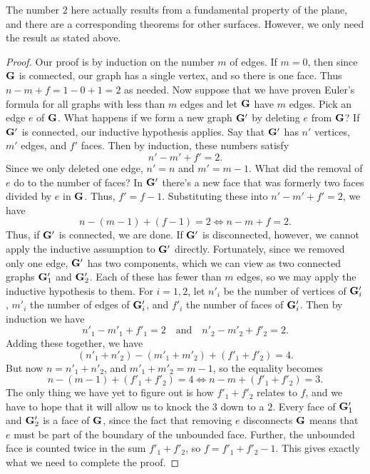 The number $2$ here actually results from a fundamental property of
the plane, and there are a corresponding theorems for other
surfaces. However, we only need the result as stated above.

\begin{proof}
  Our proof is by induction on the number $m$ of edges. If $m=0$, then
  since $\mathbf{G}$ is connected, our graph has a single vertex, and so
  there is one face. Thus $n-m+f = 1-0+1=2$ as needed. Now suppose
  that we have proven Euler's formula for all graphs with less than
  $m$ edges and let $\mathbf{G}$ have $m$ edges. Pick an edge $e$ of
  $\mathbf{G}$. What happens if we form a new graph $\mathbf{G}'$ by deleting $e$
  from $\mathbf{G}$? If $\mathbf{G}'$ is connected, our inductive hypothesis
  applies. Say that $\mathbf{G}'$ has $n'$ vertices, $m'$ edges, and $f'$
  faces. Then by induction, these numbers satisfy
  \[n'-m'+f'=2.\]
  Since we only deleted one edge, $n'=n$ and $m'=m-1$. What did the
  removal of $e$ do to the number of faces? In $\mathbf{G}'$ there's a new
  face that was formerly two faces divided by $e$ in $\mathbf{G}$. Thus,
  $f'=f-1$. Substituting these into $n'-m'+f'=2$, we have
  \[n-(m-1)+(f-1)=2 \iff n-m+f=2.\]
  Thus, if $\mathbf{G}'$ is connected, we are done. If $\mathbf{G}'$ is
  disconnected, however, we cannot apply the inductive assumption to
  $\mathbf{G}'$ directly. Fortunately, since we removed only one edge,
  $\mathbf{G}'$ has two components, which we can view as two connected
  graphs $\mathbf{G}'_1$ and $\mathbf{G}'_2$. Each of these has fewer than $m$
  edges, so we may apply the inductive hypothesis to them. For
  $i=1,2$, let $n'_i$ be the number of vertices of $\mathbf{G}'_i$, $m'_i$
  the number of edges of $\mathbf{G}'_i$, and $f'_i$ the number of faces of
  $\mathbf{G}'_i$. Then by induction we have
  \[n'_1 - m'_1 + f'_1 = 2 \quad \text{and}\quad n'_2-m'_2+f'_2 =2.\]
  Adding these together, we have
  \[(n'_1 + n'_2) - (m'_1 + m'_2) + (f'_1 + f'_2) = 4.\]
  But now $n=n'_1 + n'_2$, and $m'_1 + m'_2 = m-1$, so the equality
  becomes
  \[n - (m-1) + (f'_1+f'_2) = 4 \iff n-m + (f'_1 + f'_2) = 3.\]
  The only thing we have yet to figure out is how $f'_1+f'_2$ relates
  to $f$, and we have to hope that it will allow us to knock the $3$
  down to a $2$. Every face of $\mathbf{G}'_1$ and $\mathbf{G}'_2$ is a face of
  $\mathbf{G}$, since the fact that removing $e$ disconnects $\mathbf{G}$ means
  that $e$ must be part of the boundary of the unbounded
  face. Further, the unbounded face is counted twice in the sum $f'_1
  + f'_2$, so $f=f'_1 + f'_2 -1$. This gives exactly what we need to
  complete the proof.
\end{proof}

